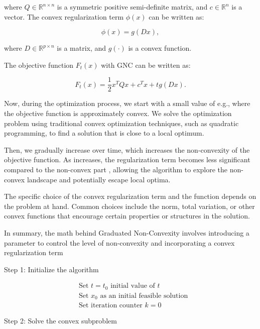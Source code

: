 where $Q \in \mathbb{R}^{n \times n}$ is a symmetric positive semi-definite matrix, and $c \in \mathbb{R}^n$ is a vector.
The convex regularization term $\phi(x)$ can be written as:

\begin{equation}
	\phi(x) = g(Dx),
\end{equation}

where $D \in \mathbb{R}^{p \times n}$ is a matrix, and $g(\cdot)$ is a convex function.

The objective function $F_t(x)$ with GNC can be written as:

\begin{equation}
	F_t(x) = \frac{1}{2} x^T Q x + c^T x + t g(Dx).
\end{equation}

Now, during the optimization process, we start with a small value of  e.g.,  where the objective function is approximately convex. We solve the optimization problem using traditional convex optimization techniques, such as quadratic programming, to find a solution  that is close to a local optimum.

Then, we gradually increase  over time, which increases the non-convexity of the objective function. As  increases, the regularization term becomes less significant compared to the non-convex part , allowing the algorithm to explore the non-convex landscape and potentially escape local optima.

The specific choice of the convex regularization term  and the function  depends on the problem at hand. Common choices include the  norm, total variation, or other convex functions that encourage certain properties or structures in the solution.

In summary, the math behind Graduated Non-Convexity involves introducing a parameter  to control the level of non-convexity and incorporating a convex regularization term 


Step 1: Initialize the algorithm

\begin{align*}
&\text{Set } t = t_0 \text{ initial value of } t \\
&\text{Set } x_0 \text{ as an initial feasible solution} \\
&\text{Set iteration counter } k = 0
\end{align*}


Step 2: Solve the convex subproblem

